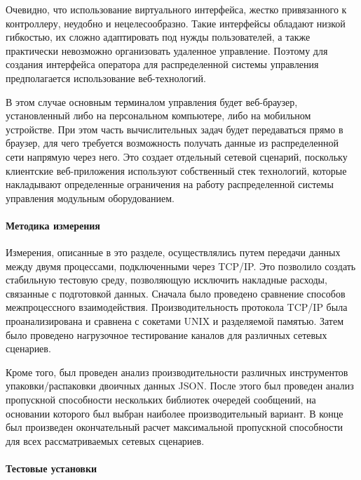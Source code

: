 \begin{enumerate}
Очевидно, что использование виртуального интерфейса, жестко привязанного к контроллеру, неудобно и нецелесообразно. Такие интерфейсы обладают низкой гибкостью, их сложно адаптировать под нужды пользователей, а также практически невозможно организовать удаленное управление. Поэтому для создания интерфейса оператора для распределенной системы управления предполагается использование веб-технологий.

В этом случае основным терминалом управления будет веб-браузер, установленный либо на персональном компьютере, либо на мобильном устройстве. При этом часть вычислительных задач будет передаваться прямо в браузер, для чего требуется возможность получать данные из распределенной сети напрямую через него. Это создает отдельный сетевой сценарий, поскольку клиентские веб-приложения используют собственный стек технологий, которые накладывают определенные ограничения на работу распределенной системы управления модульным оборудованием.

\end{enumerate}

\paragraph{Методика измерения}
\label{sec: methodology}

Измерения, описанные в это разделе, осуществлялись путем передачи данных между двумя процессами, подключенными через TCP/IP. Это позволило создать стабильную тестовую среду, позволяющую исключить накладные расходы, связанные с подготовкой данных. Сначала было проведено сравнение способов межпроцессного взаимодействия. Производительность протокола TCP/IP была проанализирована и сравнена с сокетами UNIX и разделяемой памятью. Затем было проведено нагрузочное тестирование каналов для различных сетевых сценариев.

Кроме того, был проведен анализ производительности различных инструментов упаковки/распаковки двоичных данных JSON. После этого был проведен анализ пропускной способности нескольких библиотек очередей сообщений, на основании которого был выбран наиболее производительный вариант. В конце был произведен окончательный расчет максимальной пропускной способности для всех рассматриваемых сетевых сценариев.

\paragraph{Тестовые установки}


